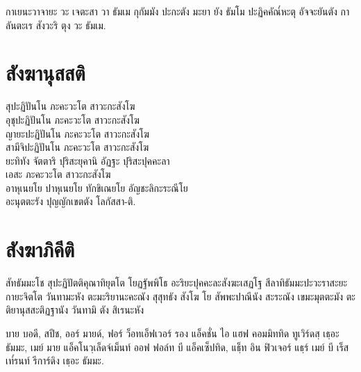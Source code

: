 \begin{instruction}
[ หมอบกราบ ]
\end{instruction}

\begin{thaitrans}
กาเยนะวาจายะ วะ เจตะสา วา
ธัมเม กุกัมมัง ปะกะตัง มะยา ยัง
ธัมโม ปะฏิคคัณ๎หะตุ อัจจะยันตัง
กาลันตะเร สังวะริ ตุง วะ ธัมเม.
\end{thaitrans}

\chapter{สังฆานุสสติ}

\begin{leader}
\end{leader}

สุปะฏิปันโน ภะคะวะโต สาวะกะสังโฆ\\
อุชุปะฏิปันโน ภะคะวะโต สาวะกะสังโฆ\\
ญายะปะฏิปันโน ภะคะวะโต สาวะกะสังโฆ\\
สามีจิปะฏิปันโน ภะคะวะโต สาวะกะสังโฆ\\
ยะทิทัง จัตตาริ ปุริสะยุคานิ อัฏฐะ ปุริสะปุคคะลา\\
เอสะ ภะคะวะโต สาวะกะสังโฆ\\
อาหุเนยโย ปาหุเนยโย ทักขิเณยโย อัญชะลิกะระณีโย\\
อะนุตตะรัง ปุญญักเขตตัง โลกัสสา-ติ.\\

\chapter{สังฆาภิคีติ}

\begin{leader}
\end{leader}

\begin{thaitrans}
สัทธัมมะโช สุปะฏิปัตติคุณาทิยุตโต
โยฏฐัพพิโธ อะริยะปุคคะละสังฆะเสฏโฐ
สีลาทิธัมมะปะวะราสะยะกายะจิตโต
วันทามะหัง ตะมะริยานะคะณัง สุสุทธัง
สังโฆ โย สัพพะปาณีนัง สะระณัง เขมะมุตตะมัง
ตะติยานุสสะติฏฐานัง วันทามิ ตัง สิเรนะหัง
\end{thaitrans}

\begin{instruction}
[ หมอบกราบ ]
\end{instruction}

\begin{thaitrans}
บาย บอดี, สปีช, ออร์ มายด์,
ฟอร์ ว็อทเอ็ฟเวอร์ รอง แอ็คชั่น ไอ แฮฟ คอมมิททิด ทูเวิร์ดสฺ  เธฺอะ ธัมมะ,
เมย์ มาย แอ็คโนวฺเล็ดจ์เม็นท์ ออฟ ฟอล์ท บี แอ็คเซ็ปทิด,
แธฺ็ท อิน ฟิวเจอร์ แธฺร์ เมย์ บี เร็สเท๎รนท์ รีการ์ดิง เธฺอะ ธัมมะ.
\end{thaitrans}

